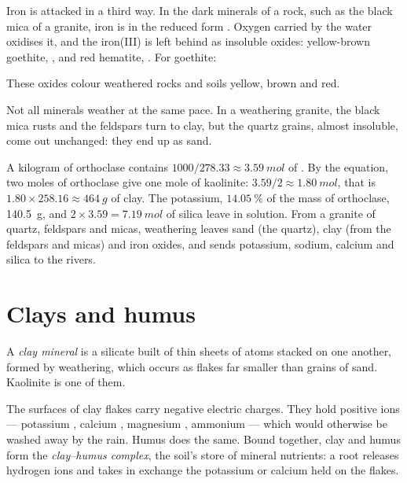 Iron is attacked in a third way. In the dark minerals of a rock, such as the
black mica of a granite, iron is in the reduced form . Oxygen
carried by the water oxidises it, and the iron(III) is left behind as
insoluble oxides: yellow-brown goethite, , and red hematite,
. For goethite:
\begin{center}
\end{center}
These oxides colour weathered rocks and soils yellow, brown and red.

Not all minerals weather at the same pace. In a weathering granite, the black
mica rusts and the feldspars turn to clay, but the quartz grains, almost
insoluble, come out unchanged: they end up as sand.

\begin{example}\label{ex:g10:soil-formation:granite}
A kilogram of orthoclase contains $1000/278.33 \approx \qty{3.59}{mol}$ of
. By the equation, two moles of orthoclase give one mole of
kaolinite: $3.59/2 \approx \qty{1.80}{mol}$, that is $1.80 \times 258.16
\approx \qty{464}{g}$ of clay. The potassium, $14.05~\%$ of the mass of
orthoclase, \qty{140.5}{g}, and $2 \times 3.59 = \qty{7.19}{mol}$ of silica
leave in solution. From a granite of quartz, feldspars and micas, weathering
leaves sand (the quartz), clay (from the feldspars and micas) and iron oxides,
and sends potassium, sodium, calcium and silica to the rivers.
\end{example}

\section{Clays and humus}

\begin{definition}\label{def:g10:soil-formation:clay}
A \emph{clay mineral} is a silicate built of thin sheets
of atoms stacked on one another, formed by weathering, which occurs as flakes
far smaller than grains of sand. Kaolinite is one of them.
\end{definition}

The surfaces of clay flakes carry negative electric charges. They hold
positive ions --- potassium , calcium , magnesium
, ammonium  --- which would otherwise be washed away by the
rain. Humus does the same. Bound together, clay and humus form the
\emph{clay--humus complex}, the soil's store of mineral nutrients: a root
releases hydrogen ions and takes in exchange the potassium or calcium held on
the flakes.

